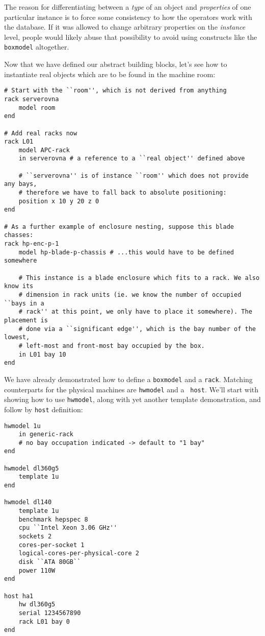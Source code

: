 \documentclass[11pt]{article}
\begin{document}
The reason for differentiating between a {\em type} of an object and {\em
properties} of one particular instance is to force some consistency to how the
operators work with the database.  If it was allowed to change arbitrary
properties on the {\em instance} level, people would likely abuse that
possibility to avoid using constructs like the {\tt boxmodel} altogether.

Now that we have defined our abstract building blocks, let's see how to
instantiate real objects which are to be found in the machine room:

{\scriptsize
\begin{verbatim}
# Start with the ``room'', which is not derived from anything
rack serverovna
    model room
end

# Add real racks now
rack L01
    model APC-rack
    in serverovna # a reference to a ``real object'' defined above

    # ``serverovna'' is of instance ``room'' which does not provide any bays,
    # therefore we have to fall back to absolute positioning:
    position x 10 y 20 z 0
end

# As a further example of enclosure nesting, suppose this blade chasses:
rack hp-enc-p-1
    model hp-blade-p-chassis # ...this would have to be defined somewhere

    # This instance is a blade enclosure which fits to a rack. We also know its
    # dimension in rack units (ie. we know the number of occupied ``bays in a
    # rack'' at this point, we only have to place it somewhere). The placement is
    # done via a ``significant edge'', which is the bay number of the lowest,
    # left-most and front-most bay occupied by the box.
    in L01 bay 10
end
\end{verbatim}
}

We have already demonstrated how to define a {\tt boxmodel} and a {\tt rack}.
Matching counterparts for the physical machines are {\tt hwmodel} and a {\tt
host}.  We'll start with showing how to use {\tt hwmodel}, along with yet
another template demonstration, and follow by {\tt host} definition:

{\scriptsize
\begin{verbatim}
hwmodel 1u
    in generic-rack
    # no bay occupation indicated -> default to "1 bay"
end

hwmodel dl360g5
    template 1u
end

hwmodel dl140
    template 1u
    benchmark hepspec 8
    cpu ``Intel Xeon 3.06 GHz''
    sockets 2
    cores-per-socket 1
    logical-cores-per-physical-core 2
    disk ``ATA 80GB``
    power 110W
end

host ha1
    hw dl360g5
    serial 1234567890
    rack L01 bay 0
end
\end{verbatim}
}
\end{document}
